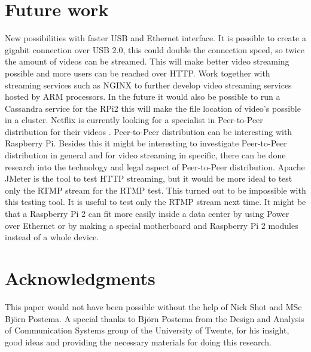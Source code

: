 \documentclass{sig-alternate-br}
\begin{document}
\section{Future work}
New possibilities with faster USB and Ethernet interface. It is possible to create a gigabit connection over USB 2.0, this could double the connection speed, so twice the amount of videos can be streamed. This will make better video streaming possible and more users can be reached over HTTP. Work together with streaming services such as NGINX to further develop video streaming services hosted by ARM processors. In the future it would also be possible to run a Cassandra service for the RPi2 this will make the file location of video's possible in a cluster. Netflix is currently looking for a specialist in  Peer-to-Peer distribution for their videos \cite{netflix}.  Peer-to-Peer distribution can be interesting with Raspberry Pi. Besides this it might be interesting to investigate Peer-to-Peer distribution in general and for video streaming in specific, there can be done research into the technology and legal aspect of  Peer-to-Peer distribution. Apache JMeter is the tool to test HTTP streaming, but it would be more ideal to test only the RTMP stream for the RTMP test.  This turned out to be impossible with this testing tool. It is useful to test only the RTMP stream next time. It might be that a Raspberry Pi 2 can fit more easily inside a data center by using Power over Ethernet or by making a special motherboard and Raspberry Pi 2 modules instead of a whole device. 

\section{Acknowledgments}
This paper would not have been possible without the help of Nick Shot and MSc Björn Postema. A special thanks to Björn Postema from the Design and Analysis of Communication Systems group of the University of Twente, for his insight, good ideas and providing the necessary materials for doing this research.


%
%


\clearpage
\appendix
\end{document}
